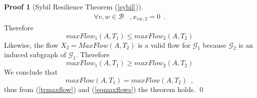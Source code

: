 \documentclass[11pt]{llncs}
\theoremstyle{definition}
\newtheorem*{sepproof}{Proof}
\begin{document}
\begin{sepproof}[Sybil Resilience Theorem (\ref{sybil})]
\begin{align*}
          \forall v,w \in \mathcal{B}&, x_{vw,2} = 0 \enspace.
       \end{align*}
       Therefore
       \begin{equation*}
          maxFlow_1\left(A, T_1\right) \leq maxFlow_2\left(A, T_2\right)
       \end{equation*}
       Likewise, the flow $X_2 = MaxFlow(A, T_2)$ is a valid flow for $\mathcal{G}_1$ because $\mathcal{G}_2$ is an induced
       subgraph of $\mathcal{G}_1$. Therefore
       \begin{equation*}
          maxFlow_1\left(A, T_1\right) \geq maxFlow_2\left(A, T_2\right)
       \end{equation*}
       We conclude that
       \begin{equation}
       \label{eqmaxflows}
          maxFlow\left(A, T_1\right) = maxFlow\left(A, T_2\right) \enspace,
       \end{equation}
       thus from (\ref{trmaxflow}) and (\ref{eqmaxflows}) the theorem holds.
       \qed
    \end{sepproof}
\end{document}
